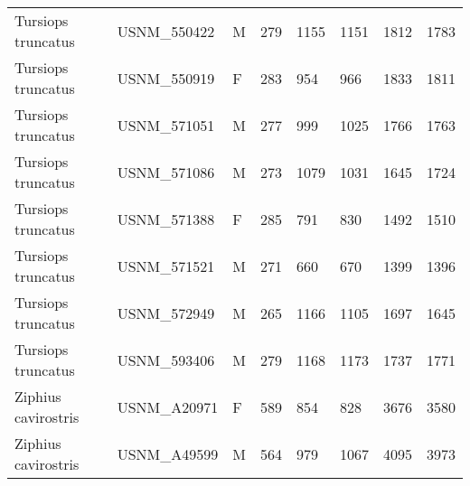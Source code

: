 \begin{longtable}{|p{1in}p{1in}p{.15in}p{.4in}p{.4in}p{.5in}p{.5in}p{.75in}|}
  Tursiops truncatus & USNM\_550422 & M & 279 & 1155 & 1151 & 1812 & 1783 \\ 
  Tursiops truncatus & USNM\_550919 & F & 283 & 954 & 966 & 1833 & 1811 \\ 
  Tursiops truncatus & USNM\_571051 & M & 277 & 999 & 1025 & 1766 & 1763 \\ 
  Tursiops truncatus & USNM\_571086 & M & 273 & 1079 & 1031 & 1645 & 1724 \\ 
  Tursiops truncatus & USNM\_571388 & F & 285 & 791 & 830 & 1492 & 1510 \\ 
  Tursiops truncatus & USNM\_571521 & M & 271 & 660 & 670 & 1399 & 1396 \\ 
  Tursiops truncatus & USNM\_572949 & M & 265 & 1166 & 1105 & 1697 & 1645 \\ 
  Tursiops truncatus & USNM\_593406 & M & 279 & 1168 & 1173 & 1737 & 1771 \\ 
  Ziphius cavirostris & USNM\_A20971 & F & 589 & 854 & 828 & 3676 & 3580 \\ 
  Ziphius cavirostris & USNM\_A49599 & M & 564 & 979 & 1067 & 4095 & 3973 \\ 
   \hline
\end{longtable}

\normalfont
